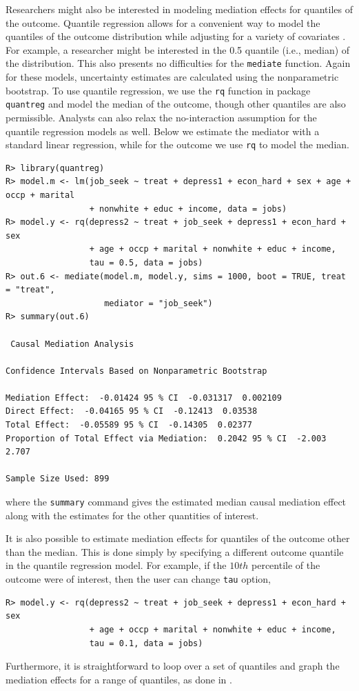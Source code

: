 \documentclass[11pt,letterpaper]{article}
\theoremstyle{plain}
\begin{document}
Researchers might also be interested in modeling mediation effects for
quantiles of the outcome.  Quantile regression allows for a convenient
way to model the quantiles of the outcome distribution while adjusting
for a variety of covariates \citep{Koenker:2005}.  For example, a
researcher might be interested in the 0.5 quantile (i.e., median)
of the distribution. This also presents no difficulties for the
\texttt{mediate} function.  Again for these models, uncertainty
estimates are calculated using the nonparametric bootstrap.  To use
quantile regression, we use the {\tt rq} function in package 
\texttt{quantreg} and model
the median of the outcome, though other quantiles are also
permissible.  Analysts can also relax the no-interaction assumption
for the quantile regression models as well.  Below we estimate the
mediator with a standard linear regression, while for the outcome we
use \texttt{rq} to model the median.
\begin{verbatim}
R> library(quantreg)
R> model.m <- lm(job_seek ~ treat + depress1 + econ_hard + sex + age + occp + marital
                 + nonwhite + educ + income, data = jobs)
R> model.y <- rq(depress2 ~ treat + job_seek + depress1 + econ_hard + sex
                 + age + occp + marital + nonwhite + educ + income, 
                 tau = 0.5, data = jobs)
R> out.6 <- mediate(model.m, model.y, sims = 1000, boot = TRUE, treat = "treat",
                    mediator = "job_seek")
R> summary(out.6)

 Causal Mediation Analysis 

Confidence Intervals Based on Nonparametric Bootstrap

Mediation Effect:  -0.01424 95 % CI  -0.031317  0.002109 
Direct Effect:  -0.04165 95 % CI  -0.12413  0.03538 
Total Effect:  -0.05589 95 % CI  -0.14305  0.02377 
Proportion of Total Effect via Mediation:  0.2042 95 % CI  -2.003  2.707 

Sample Size Used: 899 
\end{verbatim}
where the {\tt summary} command gives the estimated median causal
mediation effect along with the estimates for the other quantities of
interest.

It is also possible to estimate mediation effects for quantiles of the
outcome other than the median. This is done simply by specifying a
different outcome quantile in the quantile regression model. For
example, if the $10th$ percentile of the outcome were of interest,
then the user can change {\tt tau} option,
\begin{verbatim}
R> model.y <- rq(depress2 ~ treat + job_seek + depress1 + econ_hard + sex
                 + age + occp + marital + nonwhite + educ + income, 
                 tau = 0.1, data = jobs)
\end{verbatim}
Furthermore, it is straightforward to loop over a set of quantiles and
graph the mediation effects for a range of quantiles, as done in
\citet{imai:keel:ting:10}.
\end{document}
